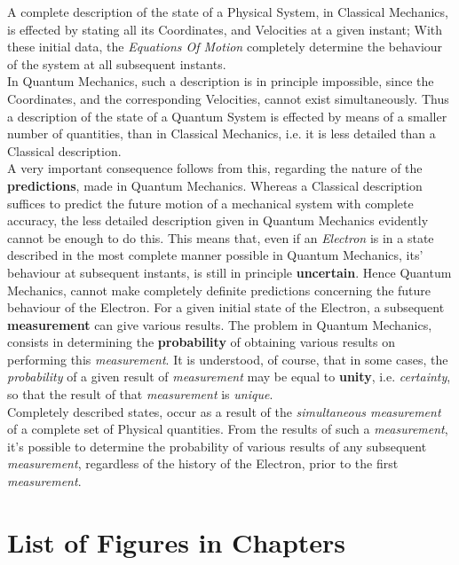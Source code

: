 \documentclass[a4paper, 10pt, onepage]{elegantbook}
\begin{document}
A complete description of the state of a Physical System, in Classical Mechanics, is effected by stating all its Coordinates, and Velocities at a given instant; With these initial data, the \emph{Equations Of Motion} completely determine the behaviour of the system at all subsequent instants. \\
In Quantum Mechanics, such a description is in principle impossible, since the Coordinates, and the corresponding Velocities, cannot exist simultaneously.
Thus a description of the state of a Quantum System is effected by means of a smaller number of quantities, than in Classical Mechanics, i.e. it is less detailed than a Classical description.  \\
A very important consequence follows from this, regarding the nature of the \textbf{predictions}, made in Quantum Mechanics. Whereas a Classical description suffices to predict the future motion of a mechanical system with complete accuracy, the less detailed description given in Quantum Mechanics evidently cannot be enough to do this. This means that, even if an \emph{Electron} is in a state described in the most complete manner possible in Quantum Mechanics, its' behaviour at subsequent instants, is still in principle \textbf{uncertain}. Hence Quantum Mechanics, cannot make completely definite predictions concerning the future behaviour of the Electron. For a given initial state of the Electron, a subsequent \textbf{measurement} can give various results. The problem in Quantum Mechanics, consists in determining the \textbf{probability} of obtaining various results on performing this \emph{measurement}. It is understood, of course, that in some cases, the \emph{probability} of a given result of \emph{measurement} may be equal to  \textbf{unity}, i.e. \emph{certainty}, so that the result of that \emph{measurement} is \emph{unique}.  \\
Completely described states, occur as a result of the \emph{simultaneous measurement} of a complete set of Physical quantities. From the results of such a \emph{measurement}, it's possible to determine the probability of various results of any subsequent \emph{measurement}, regardless of the history of the Electron, prior to the first \emph{measurement}.

\newpage

\section{List of Figures in Chapters}
\end{document}
